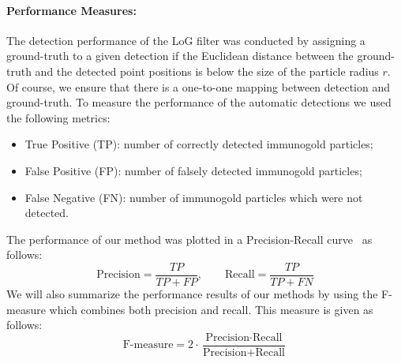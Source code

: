 \documentclass[a4paper,11pt]{article}
\newcommand{\1}{\mathbbm{1}}
\theoremstyle{plain}
\begin{document}
\paragraph{Performance Measures:}
The detection performance of the \ac{LoG} filter was conducted by assigning a ground-truth to a given detection if the Euclidean distance between the ground-truth and the detected point positions is below the size of the particle radius $r$. Of course, we ensure that there is a one-to-one mapping between detection and ground-truth. To measure the performance of the automatic detections we used the following metrics:
\begin{itemize}
\item True Positive (TP): number of correctly detected immunogold particles;
\item False Positive (FP): number of falsely detected immunogold particles;
\item False Negative (FN): number of immunogold particles which were not detected.
\end{itemize}
The performance of our method was plotted in a Precision-Recall curve~\cite{davis2006} as follows:
\begin{equation}
   \text{Precision}  = \frac{TP}{TP+FP}, \qquad  \text{Recall} = \frac{TP}{TP+FN}
\label{eq:prec_rec}
\end{equation}
We will also summarize the performance results of our methods by using the F-measure which combines both precision and recall. This measure is given as follows:
\begin{equation}
   \text{F-measure}  = 2 \cdot \frac{\text{Precision} \cdot \text{Recall}}{\text{Precision}+\text{Recall}}
\label{eq:prec_rec1}
\end{equation}
\end{document}

